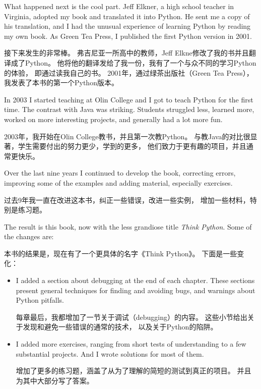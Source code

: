 \documentclass[10pt]{book}
\begin{document}
\begin{CJK}{UTF8}{gbsn}
What happened next is the cool part.  Jeff Elkner, a high school
teacher in Virginia, adopted my book and translated it into
Python.  He sent me a copy of his translation, and I had the
unusual experience of learning Python by reading my own book.
As Green Tea Press, I published the first Python version in 2001.

接下来发生的非常棒。
弗吉尼亚一所高中的教师，Jeff Elkne修改了我的书并且翻译成了Python。
他将他的翻译发给了我一份，我有了一个与众不同的学习Python的体验，
即通过读我自己的书。
2001年，通过绿茶出版社（Green Tea Press），我发表了本书的第一个Python版本。

In 2003 I started teaching at Olin College and I got to teach
Python for the first time.  The contrast with Java was striking.
Students struggled less, learned more, worked on more interesting
projects, and generally had a lot more fun.

2003年，我开始在Olin College教书，并且第一次教Python。
与教Java的对比很显著，学生需要付出的努力更少，学到的更多，
他们致力于更有趣的项目，并且通常更快乐。

Over the last nine years I continued to develop the book,
correcting errors, improving some of the examples and
adding material, especially exercises.

过去9年我一直在改进这本书，纠正一些错误，改进一些实例，
增加一些材料，特别是练习题。

The result is this book, now with the less grandiose title
{\em Think Python}.  Some of the changes are:

本书的结果是，现在有了一个更具体的名字《Think Python》。
下面是一些变化：

\begin{itemize}

\item I added a section about debugging at the end of each chapter.
  These sections present general techniques for finding and avoiding
  bugs, and warnings about Python pitfalls.
  
每章最后，我都增加了一节关于调试（debugging）的内容。
这些小节给出关于发现和避免一些错误的通常的技术，
以及关于Python的陷阱。

\item I added more exercises, ranging from short tests of
  understanding to a few substantial projects.  And I wrote
  solutions for most of them.

增加了更多的练习题，涵盖了从为了理解的简短的测试到真正的项目。
并且为其中大部分写了答案。


\end{itemize}
\end{CJK}
\end{document}
